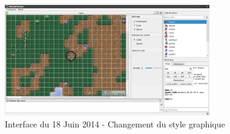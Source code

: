 \begin{figure}[h!]
	\centering
	\includegraphics[width=0.8\textwidth]{img/gui_history/2014_06_18_screen.png}
	\caption{Interface du 18 Juin 2014 - Changement du style graphique}
\end{figure}